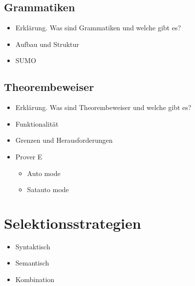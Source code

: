 \documentclass[german,version-2020-11]{uzl-thesis}
\begin{document}
  \section{Grammatiken}
    \begin{itemize}
      \item Erklärung. Was sind Grammatiken und welche gibt es?
      \item Aufbau und Struktur
      \item SUMO
    \end{itemize}
  \section{Theorembeweiser}
    \begin{itemize}
      \item Erklärung. Was sind Theorembeweiser und welche gibt es?
      \item Funktionalität
      \item Grenzen und Herausforderungen
      \item Prover E
        \begin{itemize}
          \item Auto mode 
          \item Satauto mode 
        \end{itemize}
    \end{itemize} 
\chapter{Selektionsstrategien}
  \begin{itemize}
    \item Syntaktisch 
    \item Semantisch
    \item Kombination
  \end{itemize}
\end{document}
